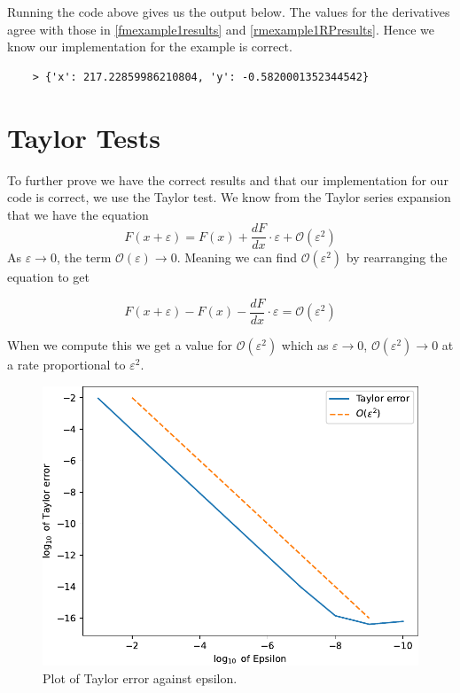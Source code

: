 \documentclass{article}
\begin{document}
Running the code above gives us the output below. The values for the derivatives agree with those in \eqref{fmexample1results} and \eqref{rmexample1RPresults}. Hence we know our implementation for the example is correct.
\begin{verbatim}
    > {'x': 217.22859986210804, 'y': -0.5820001352344542}
\end{verbatim}

\section{Taylor Tests}

To further prove we have the correct results and that our implementation for our code is correct, we use the Taylor test. We know from the Taylor series expansion that we have the equation
\begin{equation}
    F(x + \varepsilon) = F(x) + \frac{dF}{dx} \cdot \varepsilon + \mathcal{O}(\varepsilon ^ 2)
\end{equation}
As $\varepsilon \longrightarrow 0$, the term $\mathcal{O}(\varepsilon) \longrightarrow 0$. Meaning we can find $\mathcal{O}(\varepsilon^2)$ by rearranging the equation to get

\begin{equation}
    F(x + \varepsilon) - F(x) - \frac{dF}{dx} \cdot \varepsilon = \mathcal{O}(\varepsilon^2)
\end{equation}

When we compute this we get a value for $\mathcal{O}(\varepsilon^2)$ which as $\varepsilon \longrightarrow 0$, $\mathcal{O}(\varepsilon^2) \longrightarrow 0$ at a rate proportional to $\varepsilon^2$.

\begin{figure}[h!]
    \includegraphics[width=12cm]{images/taylor_error_1.pdf}
    \caption{Plot of Taylor error against epsilon.}
    \label{fig:taylorerror}
\end{figure}
\end{document}
